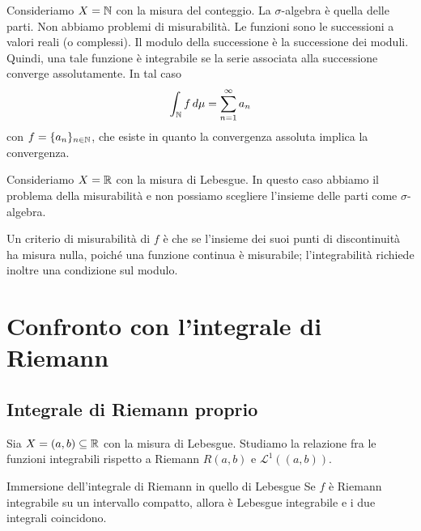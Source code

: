 \documentclass[a4paper]{article}
\begin{document}
\begin{radioactive}
\begin{snippetexample}{}
    Consideriamo \(X = \mathbb{N}\)
    con la misura del conteggio. La \(\sigma\)-algebra è quella delle parti.
    Non abbiamo problemi di misurabilità.
    Le funzioni sono le successioni a valori reali (o complessi).
    Il modulo della successione è la successione dei moduli.
    Quindi, una tale funzione è integrabile se la serie associata
    alla successione converge assolutamente. In tal caso
    \[
        \int_{\mathbb{N}} f\,d\mu=\sum_{n=1}^\infty a_n
    \]
    con \(f = \{a_n\}_{n \in \mathbb{N}}\),
    che esiste in quanto la convergenza assoluta implica la convergenza.
\end{snippetexample}
\end{radioactive}

\begin{radioactive}
\begin{snippetexample}{}
    Consideriamo \(X = \mathbb{R}\) con la misura di Lebesgue.
    In questo caso abbiamo il problema della misurabilità
    e non possiamo scegliere l'insieme delle parti come \(\sigma\)-algebra.
\end{snippetexample}
\end{radioactive}

\begin{radioactive}
Un criterio di misurabilità di \(f\) è che
se l'insieme dei suoi punti di discontinuità ha misura nulla,
poiché una funzione continua è misurabile; l'integrabilità richiede inoltre una condizione sul modulo.
\end{radioactive}

\section{Confronto con l'integrale di Riemann}

\subsection{Integrale di Riemann proprio}

\begin{radioactive}
Sia \(X = (a,b) \subseteq \mathbb{R}\) con la misura di Lebesgue.
Studiamo la relazione fra le funzioni integrabili rispetto a Riemann
\(R(a,b)\) e \(\mathcal L^1((a,b))\).
\end{radioactive}

\begin{radioactive}
\begin{snippettheorem}{Immersione dell'integrale di Riemann in quello di Lebesgue}
    Se \(f\) è Riemann integrabile su un intervallo compatto, allora è Lebesgue integrabile
    e i due integrali coincidono.
\end{snippettheorem}
\end{radioactive}
\end{document}
